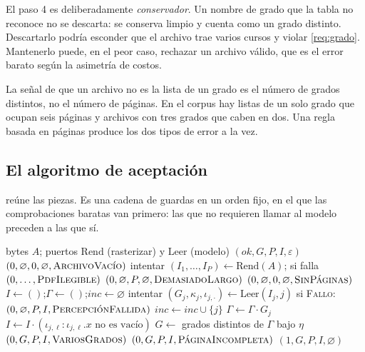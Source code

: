 El paso 4 es deliberadamente \emph{conservador}. Un nombre de grado que la
tabla no reconoce no se descarta: se conserva limpio y cuenta como un grado
distinto. Descartarlo podría esconder que el archivo trae varios cursos y
violar \ref{req:grado}. Mantenerlo puede, en el peor caso, rechazar un archivo
válido, que es el error barato según la asimetría de costos.

\begin{observacion}
La señal de que un archivo no es la lista de un grado es el número de grados
distintos, no el número de páginas. En el corpus hay listas de un solo grado
que ocupan seis páginas y archivos con tres grados que caben en dos. Una regla
basada en páginas produce los dos tipos de error a la vez.
\end{observacion}

\subsection{El algoritmo de aceptación}

 reúne las piezas. Es una cadena de guardas en un orden
fijo, en el que las comprobaciones baratas van primero: las que no requieren
llamar al modelo preceden a las que sí.

\begin{algorithm}[htbp]
\caption{Percibir un archivo: todo o nada}
\label{alg:percibir}
\begin{algorithmic}[1]
\Require bytes $A$; puertos $\mathrm{Rend}$ (rasterizar) y $\mathrm{Leer}$ (modelo)
\Ensure $(\mathit{ok}, G, P, I, \varepsilon)$
 \Return $(0,\varnothing,0,\varnothing,\textsc{ArchivoVacío})$ \EndIf
\State intentar $(I_1,\dots,I_P)\gets\mathrm{Rend}(A)$; si falla
       \Return $(0,\dots,\textsc{PdfIlegible})$
 \Return $(0,\varnothing,P,\varnothing,\textsc{DemasiadoLargo})$
\EndIf
{} \Return $(0,\varnothing,0,\varnothing,\textsc{SinPáginas})$ \EndIf
\State $I\gets()$;\quad $\Gamma\gets()$;\quad $\mathit{inc}\gets\varnothing$
  \State intentar $(G_j,\kappa_j,\iota_{j,\cdot})\gets\mathrm{Leer}(I_j,j)$
  \State \quad si \textsc{Fallo}: \Return $(0,\varnothing,P,I,\textsc{PercepciónFallida})$
   $\mathit{inc}\gets\mathit{inc}\cup\{j\}$ \EndIf
  \State $\Gamma\gets\Gamma\cdot G_j$
  \State $I\gets I\cdot(\iota_{j,\ell} : \iota_{j,\ell}.x \text{ no es vacío})$
\EndFor
\State $G\gets$ grados distintos de $\Gamma$ bajo $\eta$ 
 \Return $(0,G,P,I,\textsc{VariosGrados})$ \EndIf
{} \Return $(0,G,P,I,\textsc{PáginaIncompleta})$ \EndIf
\State \Return $(1,G,P,I,\varnothing)$
\end{algorithmic}
\end{algorithm}

